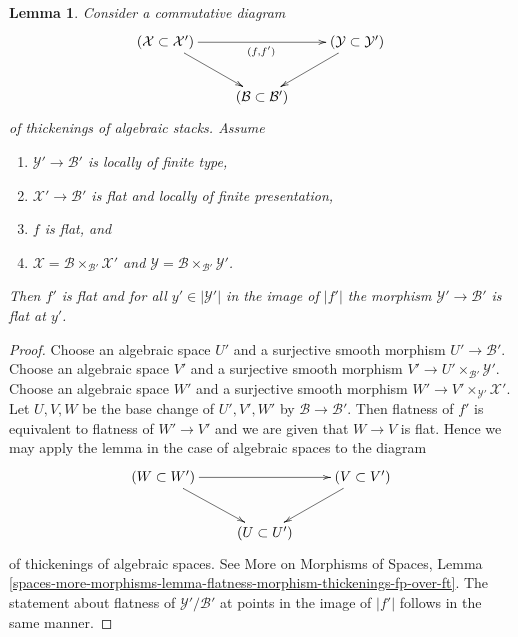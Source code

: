 \documentclass[10pt,a4paper]{amsart}
\theoremstyle{plain}
\newtheorem{lemma}[subsection]{Lemma}
\theoremstyle{definition}
\theoremstyle{remark}
\numberwithin{equation}{subsection}
\begin{document}
\begin{lemma}
\label{lemma-flatness-morphism-thickenings-fp-over-ft}
Consider a commutative diagram
$$
\xymatrix{
(\mathcal{X} \subset \mathcal{X}') \ar[rr]_{(f, f')} \ar[rd] & &
(\mathcal{Y} \subset \mathcal{Y}') \ar[ld] \\
& (\mathcal{B} \subset \mathcal{B}')
}
$$
of thickenings of algebraic stacks. Assume
\begin{enumerate}
\item $\mathcal{Y}' \to \mathcal{B}'$ is locally of finite type,
\item $\mathcal{X}' \to \mathcal{B}'$ is
flat and locally of finite presentation,
\item $f$ is flat, and
\item $\mathcal{X} = \mathcal{B} \times_{\mathcal{B}'} \mathcal{X}'$ and
$\mathcal{Y} = \mathcal{B} \times_{\mathcal{B}'} \mathcal{Y}'$.
\end{enumerate}
Then $f'$ is flat and for all $y' \in |\mathcal{Y}'|$ in the image of $|f'|$
the morphism $\mathcal{Y}' \to \mathcal{B}'$ is flat at $y'$.
\end{lemma}

\begin{proof}
Choose an algebraic space $U'$ and a surjective smooth morphism
$U' \to \mathcal{B}'$.
Choose an algebraic space $V'$ and a surjective smooth morphism
$V' \to U' \times_{\mathcal{B}'} \mathcal{Y}'$.
Choose an algebraic space $W'$ and a surjective smooth morphism
$W' \to V' \times_{\mathcal{Y}'} \mathcal{X}'$. Let $U, V, W$
be the base change of $U', V', W'$ by $\mathcal{B} \to \mathcal{B}'$.
Then flatness of $f'$ is equivalent to flatness of $W' \to V'$ and
we are given that $W \to V$ is flat. Hence we may apply the lemma
in the case of algebraic spaces to the diagram
$$
\xymatrix{
(W \subset W') \ar[rr] \ar[rd] & & (V \subset V') \ar[ld] \\
& (U \subset U')
}
$$
of thickenings of algebraic spaces. See
More on Morphisms of Spaces, Lemma
\ref{spaces-more-morphisms-lemma-flatness-morphism-thickenings-fp-over-ft}.
The statement about flatness of $\mathcal{Y}'/\mathcal{B}'$ at points in the
image of $|f'|$ follows in the same manner.
\end{proof}
\end{document}
